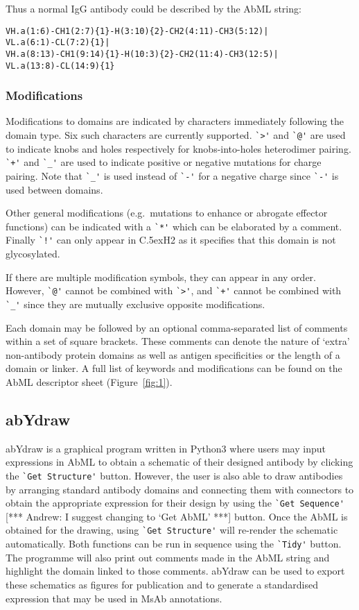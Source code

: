 \documentclass[a4paper]{article}
\newcommand{\CH}[1]{\mbox{C\lower.5ex\hbox{\scriptsize H}#1}}
\newcommand{\andrew}[1]{{\color{red} [*** Andrew: #1 ***]}}
\begin{document}
Thus a normal IgG antibody could be described by the AbML string:
\begin{verbatim}
VH.a(1:6)-CH1(2:7){1}-H(3:10){2}-CH2(4:11)-CH3(5:12)|
VL.a(6:1)-CL(7:2){1}|
VH.a(8:13)-CH1(9:14){1}-H(10:3){2}-CH2(11:4)-CH3(12:5)|
VL.a(13:8)-CL(14:9){1}
\end{verbatim}

\subsubsection{Modifications}
Modifications to domains are indicated by characters immediately following the
domain type. Six such characters are currently supported.
\verb|`>'| and \verb|`@'| are used to indicate
knobs and holes respectively for knobs-into-holes heterodimer pairing.
\verb|`+'| and \verb|`_'| are used to indicate
positive or negative mutations for charge pairing. Note that
\verb|`_'| is used instead of \verb|`-'| for a negative charge since
\verb|`-'| is used between domains.

Other general modifications (e.g.\ mutations to enhance or abrogate
effector functions) can be indicated with a \verb|`*'| which can be
elaborated by a comment. Finally \verb|`!'| can only appear in \CH{2}
as it specifies that this domain is not glycosylated.

If there are multiple modification symbols, they can appear in any
order.  However, \verb|`@'| cannot be combined with \verb|`>'|, and
\verb|`+'| cannot be combined with \verb|`_'| since they are mutually
exclusive opposite modifications.

Each domain may be followed by an optional comma-separated list of comments
within a set of square brackets. These comments can denote the nature of
`extra' non-antibody protein domains as well as antigen
specificities or the length of a domain or linker. A full list of
keywords and modifications can be found on the AbML descriptor sheet
(Figure~\ref{fig:1}).

\subsection{abYdraw}
abYdraw is a graphical program written in Python3 where users may
input expressions in AbML to obtain a schematic of their designed
antibody by clicking the \verb|`Get Structure'| button. However, the user is
also able to draw antibodies by arranging standard antibody domains
and connecting them with connectors to obtain the appropriate expression
for their design by using the \verb|`Get Sequence'|
\andrew{I suggest changing to `Get AbML'} button. Once the AbML
is obtained for the drawing, using \verb|`Get Structure'| will re-render the
schematic automatically. Both functions can be run in sequence using the
\verb|`Tidy'| button. The programme will also print out comments made in the
AbML string and highlight the domain linked to those comments. abYdraw
can be used to export these schematics as figures for
publication and to generate a standardised expression that may be used
in MsAb annotations.  
\end{document}
